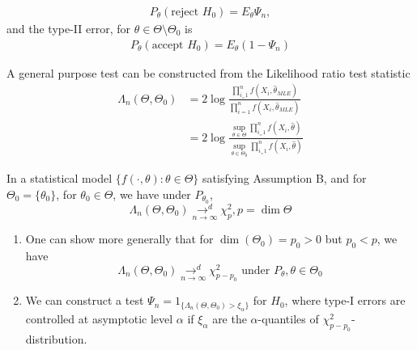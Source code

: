 \documentclass[a4paper]{article}
\begin{document}
\begin{align*}
	P_{\theta}(\text{reject } H_0) = E_{\theta} \Psi_n
,\end{align*}
and the type-II error, for $\theta \in \Theta\setminus\Theta_0$ is
\begin{align*}
	P_{\theta}(\text{accept } H_0) = E_{\theta}(1-\Psi_n)
\end{align*}

\begin{defn}
A general purpose test can be constructed from the Likelihood ratio test statistic
\begin{align*}
	\Lambda_n(\Theta,\Theta_0) &= 2\log \frac{\prod_{i_=1}^{n} f(X_i, \hat{\theta}_{MLE})}{\prod_{i=1}^{n}f(X_i, \hat{\theta}_{MLE})} \\
	&= 2\log \frac{\sup_{\theta \in \Theta} \prod_{i_=1}^{n} f(X_i, \hat{\theta})}{\sup_{\theta \in \Theta_0} \prod_{i_=1}^{n} f(X_i, \hat{\theta})}
\end{align*}
\end{defn}

\begin{thm}[Wilks']
	In a statistical model $\{f\left( \cdot , \theta \right) : \theta \in \Theta \}$ satisfying Assumption B, and for $\Theta_0 = \{\theta_0\} $, for $\theta_0 \in \Theta$, we have under $P_{\theta_0}$,
	\[
		\Lambda_{n}(\Theta, \Theta_0) \underset{n\to \infty}{\to ^{d}} \chi^2_{p},p = \dim\Theta
	\] 
	
\end{thm}

\begin{remark}
	\begin{enumerate}
		\item One can show more generally that for $\dim(\Theta_0) = p_0 > 0$ but $p_0 < p$, we have
	\[
		\Lambda_{n}(\Theta, \Theta_0) \underset{n\to \infty}{\to ^{d}} \chi^2_{p-p_0} \text{ under  } P_{\theta}, \theta \in \Theta_0
	\]
\item We can construct a test $\Psi_{n} = 1_{\{ \Lambda_n (\Theta, \Theta_0) > \xi_{\alpha}\} }$ for $H_0$, where type-I errors are controlled at asymptotic level $\alpha$ if $\xi_{\alpha}$ are the $\alpha$-quantiles of  $\chi^2_{p-p_0}$-distribution.
	\end{enumerate}
\end{remark}
\end{document}
